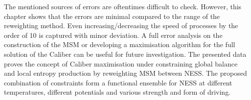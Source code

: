 The mentioned sources of errors are oftentimes difficult to check. However, this chapter shows that the errors are minimal compared to the range of the reweighting method. Even increasing/decreasing the speed of processes by the order of 10 is captured with minor deviation. A full error analysis on the construction of the MSM or developing a maximisation algorithm for the full solution of the Caliber can be useful for future investigation.  The presented data proves the concept of Caliber maximisation under constraining global balance and local entropy production by reweighting MSM between NESS. The proposed combination of constraints form a functional ensemble for NESS at different temperatures, different potentials and various strength and form of driving.    


% 
% 
% 
